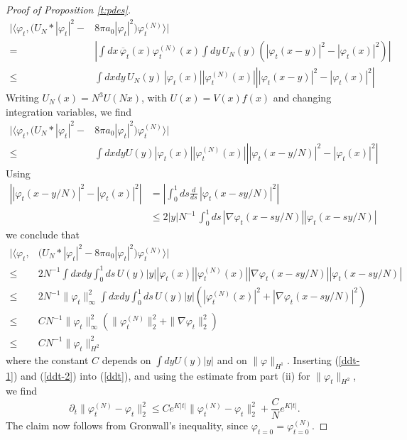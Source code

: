 \documentclass[11pt,a4paper,DIV11]{scrartcl}	%
\begin{document}
\begin{proof}[Proof of Proposition \ref{t:pdes}]
\[ \begin{split}  \Big| \Big\langle \varphi_t, \big(U_N * |\varphi_t|^2 -& 8 \pi a_0
      |\varphi_t|^2\big) \varphi_t^{(N)} \Big\rangle \Big|  \\ = \; & \left| \int dx \, \overline{\varphi}_t (x) \varphi_t^{(N)} (x) \int dy \, U_N (y) \left( |\varphi_t (x-y)|^2 - |\varphi_t (x)|^2\right) \right|   \\ \leq 
      \; & \int dx dy \, U_N (y) \, |\varphi_t (x)| |\varphi_t^{(N)} (x)| \left| |\varphi_t (x-y)|^2 - |\varphi_t (x)|^2 \right| 
  \end{split} \]    
Writing $U_N (x) = N^3 U (Nx)$, with $U (x) = V(x) f(x)$ and changing integration variables, we find
\[ \begin{split}
      \Big| \Big\langle \varphi_t, \big(U_N * |\varphi_t|^2 -& 8 \pi a_0
      |\varphi_t|^2\big) \varphi_t^{(N)} \Big\rangle \Big| \\ \leq \; &\int dx dy U (y) |\varphi_t (x)| |\varphi_t^{(N)} (x)| \left| |\varphi_t (x-y/N)|^2 - |\varphi_t (x)|^2 \right|  
  \end{split} \]
Using
\[ \begin{split} \left| |\varphi_t (x-y/N)|^2 - |\varphi_t (x)|^2 \right|  & = \left| \int_0^1 ds \frac{d}{ds} \, |\varphi_t (x-sy/N)|^2 \right| \\ &\leq 2 |y| N^{-1}\, \int_0^1ds \, |\nabla \varphi_t (x-sy/N)| |\varphi_t (x-sy/N)| \end{split} \]
we conclude that
\begin{equation}\label{ddt-1} \begin{split}
      \Big| \Big\langle \varphi_t, &\big(U_N * |\varphi_t|^2 - 8 \pi a_0
      |\varphi_t|^2\big) \varphi_t^{(N)} \Big\rangle \Big| \\ \leq\; &
   2 N^{-1}   \int dx dy \int_0^1 ds \, U (y) |y| |\varphi_t (x)| |\varphi_t^{(N)} (x)| |\nabla \varphi_t (x-sy/N)| |\varphi_t (x-sy/N)| \\ \leq \; & 2 N^{-1} \| \varphi_t \|^2_\infty \int dx dy \int_0^1 ds \, U(y) |y| \left( |\varphi_t^{(N)} (x)|^2 +  |\nabla \varphi_t (x-sy/N)|^2 \right) \\ \leq \; & CN^{-1} \| \varphi_t \|_\infty^2 \left( \| \varphi_t^{(N)} \|_2^2 + \| \nabla \varphi_t \|_2^2 \right)  \\ \leq \; & CN^{-1} \| \varphi_t \|_{H^2}^2 \end{split} \end{equation}
where the constant $C$ depends on $\int dy U(y) |y|$ and on $\| \varphi \|_{H^1}$. Inserting (\ref{ddt-1}) and (\ref{ddt-2}) into (\ref{ddt}), and using the estimate from part (ii) for $\| \varphi_t \|_{H^2}$, we find
\[\partial_t \| \varphi_t^{(N)} - \varphi_t \|_{2}^2 \le C e^{K|t|} \| \varphi_t^{(N)} - \varphi_t \|_{2}^2 + \frac{C}{N} e^{K|t|}.\]
The claim now follows from Gronwall's inequality, since $\varphi_{t=0} = \varphi^{(N)}_{t=0}$. 
\end{proof}
\end{document}
